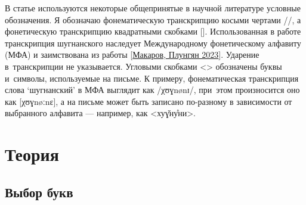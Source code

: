 В статье используются некоторые общепринятые в научной литературе условные обозначения. Я обозначаю фонематическую транскрипцию косыми чертами //, а фонетическую транскрипцию квадратными скобками []. Использованная в работе транскрипция шугнанского наследует Международному фонетическому алфавиту (МФА) и заимствована из работы [\hyperref[chapter-makplun-morphon]{Макаров, Плунгян 2023}]. Ударение в~транскрипции не указывается. Угловыми скобками <> обозначены буквы и~символы, используемые на письме. К примеру, фонематическая транскрипция слова ‘шугнанский’ в МФА выглядит как /χʊɣnønɪ/, при~этом произносится оно как [χʊɣnøːnɛ], а на письме может быть записано по-разному в зависимости от выбранного алфавита — например, как <хуɣ̌ну̊ни>.

\section{Теория} \label{ortho-theory}

\subsection{Выбор букв} \label{ortho-choice}

